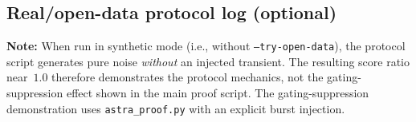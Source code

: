 \documentclass[11pt]{article}
\begin{document}
\subsection{Real/open-data protocol log (optional)}
\noindent\textbf{Note:} When run in synthetic mode (i.e., without \texttt{--try-open-data}), the protocol script generates pure noise \emph{without} an injected transient. The resulting score ratio near~$1.0$ therefore demonstrates the protocol mechanics, not the gating-suppression effect shown in the main proof script. The gating-suppression demonstration uses \texttt{astra\_proof.py} with an explicit burst injection.

\end{document}
